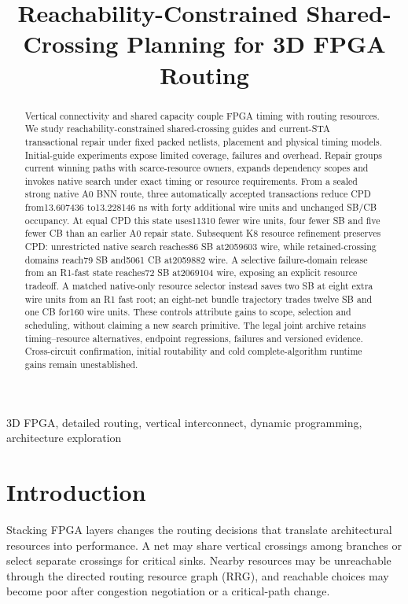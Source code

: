 \documentclass[conference,10pt]{IEEEtran}
\title{Reachability-Constrained Shared-Crossing Planning for 3D FPGA Routing}
\author{\IEEEauthorblockN{Anonymous submission draft}}
\begin{document}
\maketitle
\begin{abstract}
Vertical connectivity and shared capacity couple FPGA timing with routing resources. We study reachability-constrained shared-crossing guides and current-STA transactional repair under fixed packed netlists, placement and physical timing models. Initial-guide experiments expose limited coverage, failures and overhead. Repair groups current winning paths with scarce-resource owners, expands dependency scopes and invokes native search under exact timing or resource requirements. From a sealed strong native A0 BNN route, three automatically accepted transactions reduce CPD from13.607436 to13.228146 ns with forty additional wire units and unchanged SB/CB occupancy. At equal CPD this state uses11310 fewer wire units, four fewer SB and five fewer CB than an earlier A0 repair state. Subsequent K8 resource refinement preserves CPD: unrestricted native search reaches86 SB at2059603 wire, while retained-crossing domains reach79 SB and5061 CB at2059882 wire. A selective failure-domain release from an R1-fast state reaches72 SB at2069104 wire, exposing an explicit resource tradeoff. A matched native-only resource selector instead saves two SB at eight extra wire units from an R1 fast root; an eight-net bundle trajectory trades twelve SB and one CB for160 wire units. These controls attribute gains to scope, selection and scheduling, without claiming a new search primitive. The legal joint archive retains timing--resource alternatives, endpoint regressions, failures and versioned evidence. Cross-circuit confirmation, initial routability and cold complete-algorithm runtime gains remain unestablished.
\end{abstract}
\begin{IEEEkeywords}
3D FPGA, detailed routing, vertical interconnect, dynamic programming, architecture exploration
\end{IEEEkeywords}

\section{Introduction}
Stacking FPGA layers changes the routing decisions that translate architectural resources into performance. A net may share vertical crossings among branches or select separate crossings for critical sinks. Nearby resources may be unreachable through the directed routing resource graph (RRG), and reachable choices may become poor after congestion negotiation or a critical-path change.
\end{document}
